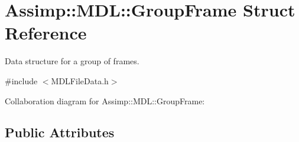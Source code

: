 \hypertarget{struct_assimp_1_1_m_d_l_1_1_group_frame}{\section{Assimp\+:\+:M\+D\+L\+:\+:Group\+Frame Struct Reference}
\label{struct_assimp_1_1_m_d_l_1_1_group_frame}
}


Data structure for a group of frames.  




{\ttfamily \#include $<$M\+D\+L\+File\+Data.\+h$>$}



Collaboration diagram for Assimp\+:\+:M\+D\+L\+:\+:Group\+Frame\+:
\subsection*{Public Attributes}
